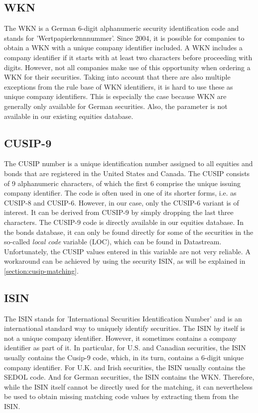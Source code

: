 \subsection{WKN} %
The WKN is a German 6-digit alphanumeric security identification code and stands for 'Wertpapierkennnummer'. Since 2004, it is possible for companies to obtain a WKN with a unique company identifier included. A WKN includes a company identifier if it starts with at least two characters before proceeding with digits. However, not all companies make use of this opportunity when ordering a WKN for their securities. Taking into account that there are also multiple exceptions from the rule base of WKN identifiers, it is hard to use these as unique company identifiers. This is especially the case because WKN are generally only available for German securities. Also, the parameter is not available in our existing equities database. 

\subsection{CUSIP-9} %
The CUSIP number is a unique identification number assigned to all equities and bonds that are registered in the United States and Canada. The CUSIP consists of 9 alphanumeric characters, of which the first 6 comprise the unique issuing company identifier. The code is often used in one of its shorter forms, i.e. as CUSIP-8 and CUSIP-6. However, in our case, only the CUSIP-6 variant is of interest. It can be derived from CUSIP-9 by simply dropping the last three characters. The CUSIP-9 code is directly available in our equities database. In the bonds database, it can only be found directly for some of the securities in the so-called \textit{local code} variable (LOC), which can be found in Datastream. Unfortunately, the CUSIP values entered in this variable are not very reliable. A workaround can be achieved by using the security ISIN, as will be explained in \ref{section:cusip-matching}. 

\subsection{ISIN} %
The ISIN stands for 'International Securities Identification Number' and is an international standard way to uniquely identify securities. The ISIN by itself is not a unique company identifier. However, it sometimes contains a company identifier as part of it. In particular, for U.S. and Canadian securities, the ISIN usually contains the Cusip-9 code, which, in its turn, contains a 6-digit unique company identifier. For U.K. and Irish securities, the ISIN usually contains the SEDOL code. And for German securities, the ISIN contains the WKN. Therefore, while the ISIN itself cannot be directly used for the matching, it can nevertheless be used to obtain missing matching code values by extracting them from the ISIN. 

